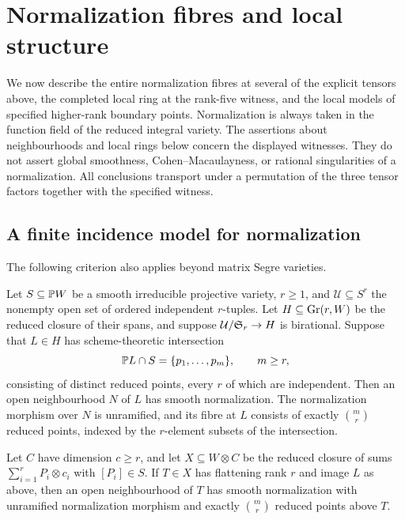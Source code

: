 \section{Normalization fibres and local structure}
\label{sec:normalization}

We now describe the entire normalization fibres at several of the
explicit tensors above, the completed local ring at the rank-five
witness, and the local models of specified higher-rank boundary points.
Normalization is always taken in the function field of the reduced
integral variety. The assertions about neighbourhoods and local rings
below concern the displayed witnesses. They do not assert global
smoothness, Cohen--Macaulayness, or rational singularities of a
normalization. All conclusions transport under a permutation of the
three tensor factors together with the specified witness.

\subsection{A finite incidence model for normalization}

The following criterion also applies beyond matrix Segre varieties.

\begin{proposition}
\label{norm:criterion}
Let $S\subseteq\mathbb P W$ be a smooth irreducible projective variety,
$r\geq1$, and $\mathcal U\subseteq S^r$ the nonempty open set of
ordered independent $r$-tuples. Let $H\subseteq\operatorname{Gr}(r,W)$ be the
reduced closure of their spans, and suppose
$\mathcal U/\mathfrak S_r\to H$ is birational. Suppose that
$L\in H$ has scheme-theoretic intersection
\[
 \mathbb P L\cap S=\{p_1,\ldots,p_m\},\qquad m\geq r,
\]
consisting of distinct reduced points, every $r$ of which are
independent. Then an open neighbourhood $N$ of $L$ has smooth
normalization. The normalization morphism over $N$ is unramified,
and its fibre at $L$ consists of exactly $\binom mr$ reduced points,
indexed by the $r$-element subsets of the intersection.

Let $C$ have dimension $c\geq r$, and let $X\subseteq W\otimes C$
be the reduced closure of sums $\sum_{i=1}^r P_i\otimes c_i$ with
$[P_i]\in S$. If $T\in X$ has flattening rank $r$ and image $L$
as above, then an open neighbourhood of $T$ has smooth normalization
with unramified normalization morphism and exactly $\binom mr$
reduced points above $T$.
\end{proposition}

